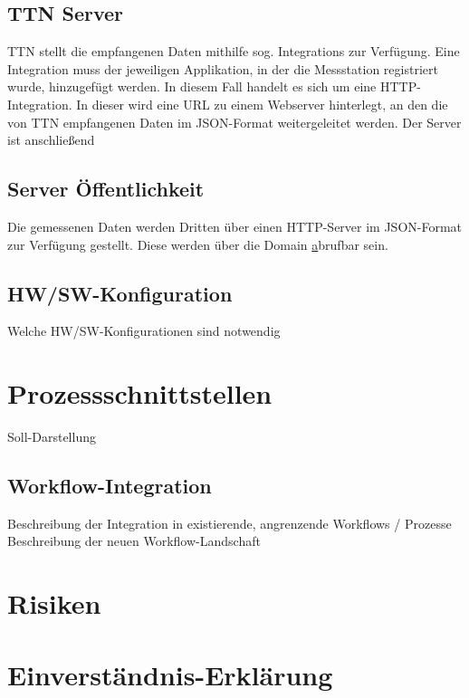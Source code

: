 \documentclass[
11pt,
a4paper,
ngerman,
]{article}
\newcommand{\descriptionWhat}[1]{%
	\begin{itshape}%
	#1 \\%
	\end{itshape}%
}
\begin{document}
\subsection{TTN \rightarrow Server}
TTN stellt die empfangenen Daten mithilfe sog. \glqq Integrations\grqq{} zur Verf\"ugung.
Eine \glqq Integration\grqq{} muss der jeweiligen Applikation, in der die Messstation registriert
wurde, hinzugef\"ugt werden.
In diesem Fall handelt es sich um eine \glqq HTTP-Integration\grqq. In dieser wird eine URL zu
einem Webserver hinterlegt, an den die von TTN empfangenen Daten im JSON-Format
weitergeleitet werden. Der Server ist anschlie{\ss}end

\subsection{Server \rightarrow \"Offentlichkeit}
Die gemessenen Daten werden Dritten \"uber einen HTTP-Server im JSON-Format zur Verf\"ugung gestellt.
Diese werden \"uber die Domain \href{http://www.berlinerdaten.de/} abrufbar sein.


\subsection{HW/SW-Konfiguration}

\descriptionWhat{Welche HW/SW-Konfigurationen sind notwendig}

\newpage

\section{Prozessschnittstellen}

\descriptionWhat{Soll-Darstellung}

\subsection{Workflow-Integration}

\descriptionWhat{Beschreibung der Integration in existierende, angrenzende Workflows / Prozesse
Beschreibung der neuen Workflow-Landschaft}

\newpage

\section{Risiken}


\newpage

\section{Einverständnis-Erklärung}
\end{document}
